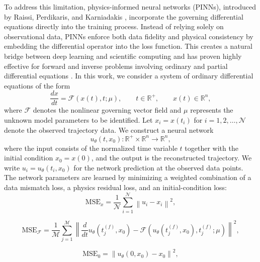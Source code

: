 \documentclass[11pt]{article}
\begin{document}
To address this limitation, physics-informed neural networks (PINNs), introduced by Raissi, Perdikaris, and Karniadakis \cite{raissi2019physics}, incorporate the governing differential equations directly into the training process. Instead of relying solely on observational data, PINNs enforce both data fidelity and physical consistency by embedding the differential operator into the loss function. This creates a natural bridge between deep learning and scientific computing and has proven highly effective for forward and inverse problems involving ordinary and partial differential equations \cite{karniadakis2021physics}. In this work, we consider a system of ordinary differential equations of the form
\begin{equation}
\frac{dx}{dt}
=
\mathscr{F}(x(t),t;\mu),
\qquad
t \in \mathbb{R}^{+},
\qquad
x(t)\in\mathbb{R}^{n},
\label{eq:pinn_system}
\end{equation}
where \(\mathscr{F}\) denotes the nonlinear governing vector field and \(\mu\) represents the unknown model parameters to be identified. Let \(x_i = x(t_i)\) for \(i=1,2,\dots,\mathscr{N}\) denote the observed trajectory data. We construct a neural network
\begin{equation}
u_{\theta}(t,x_0)
:
\mathbb{R}^{+}\times\mathbb{R}^{n}
\rightarrow
\mathbb{R}^{n},
\end{equation}
where the input consists of the normalized time variable \(t\) together with the initial condition \(x_0 = x(0)\), and the output is the reconstructed trajectory. We write \(u_i = u_{\theta}(t_i,x_0)\) for the network prediction at the observed data points. The network parameters are learned by minimizing a weighted combination of a data mismatch loss, a physics residual loss, and an initial-condition loss:
\begin{equation}
\mathrm{MSE}_{x}
=
\frac{1}{\mathscr{N}}
\sum_{i=1}^{\mathscr{N}}
\left\|
u_i - x_i
\right\|^2,
\end{equation}

\begin{equation}
\mathrm{MSE}_{\mathscr{F}}
=
\frac{1}{\mathscr{M}}
\sum_{j=1}^{\mathscr{M}}
\left\|
\frac{d}{dt}u_{\theta}(t_j^{(f)},x_0)
-
\mathscr{F}
\left(
u_{\theta}(t_j^{(f)},x_0),
t_j^{(f)};
\mu
\right)
\right\|^2,
\end{equation}

\begin{equation}
\mathrm{MSE}_{0}
=
\left\|
u_{\theta}(0,x_0)-x_0
\right\|^2,
\end{equation}
\end{document}
